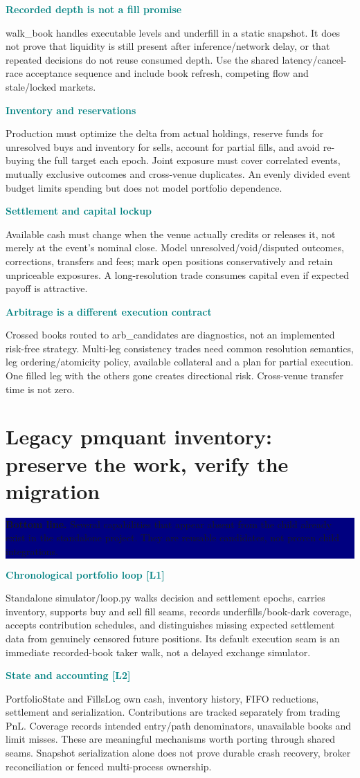 \documentclass[10pt,letterpaper]{article}
\newcommand{\bl}[1]{\noindent\colorbox{navy}{\parbox{\dimexpr\linewidth-2\fboxsep}{\color{white}\textbf{Bottom line.} #1}}\par\medskip}
\newcommand{\topic}[2]{\clearpage\section{#1}\bl{#2}}
\newcommand{\sub}[1]{\par\textbf{\textcolor{teal}{#1}}\par}
\begin{document}
\sub{Recorded depth is not a fill promise}
walk\_book handles executable levels and underfill in a static snapshot. It does not prove that liquidity is still present after inference/network delay, or that repeated decisions do not reuse consumed depth. Use the shared latency/cancel-race acceptance sequence and include book refresh, competing flow and stale/locked markets.
\sub{Inventory and reservations}
Production must optimize the delta from actual holdings, reserve funds for unresolved buys and inventory for sells, account for partial fills, and avoid re-buying the full target each epoch. Joint exposure must cover correlated events, mutually exclusive outcomes and cross-venue duplicates. An evenly divided event budget limits spending but does not model portfolio dependence.
\sub{Settlement and capital lockup}
Available cash must change when the venue actually credits or releases it, not merely at the event's nominal close. Model unresolved/void/disputed outcomes, corrections, transfers and fees; mark open positions conservatively and retain unpriceable exposures. A long-resolution trade consumes capital even if expected payoff is attractive.
\sub{Arbitrage is a different execution contract}
Crossed books routed to arb\_candidates are diagnostics, not an implemented risk-free strategy. Multi-leg consistency trades need common resolution semantics, leg ordering/atomicity policy, available collateral and a plan for partial execution. One filled leg with the others gone creates directional risk. Cross-venue transfer time is not zero.
\topic{Legacy pmquant inventory: preserve the work, verify the migration}{Several capabilities that appear absent from the child already exist in the standalone project. They are reusable candidates, not proven child integrations.}
\sub{Chronological portfolio loop [L1]}
Standalone simulator/loop.py walks decision and settlement epochs, carries inventory, supports buy and sell fill seams, records underfills/book-dark coverage, accepts contribution schedules, and distinguishes missing expected settlement data from genuinely censored future positions. Its default execution seam is an immediate recorded-book taker walk, not a delayed exchange simulator.
\sub{State and accounting [L2]}
PortfolioState and FillsLog own cash, inventory history, FIFO reductions, settlement and serialization. Contributions are tracked separately from trading PnL. Coverage records intended entry/path denominators, unavailable books and limit misses. These are meaningful mechanisms worth porting through shared seams. Snapshot serialization alone does not prove durable crash recovery, broker reconciliation or fenced multi-process ownership.
\end{document}

